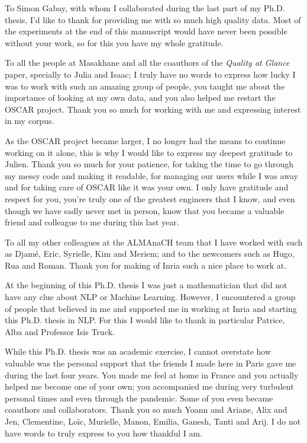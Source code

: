 To Simon Gabay, with whom I collaborated during the last part of my Ph.D. thesis, I'd like to thank for providing me with so much high quality data. Most of the experiments at the end of this manuscript would have never been possible without your work, so for this you have my whole gratitude.

To all the people at Masakhane and all the coauthors of the \emph{Quality at Glance} paper, specially to Julia and Isaac; I truly have no words to express how lucky I was to work with such an amazing group of people, you taught me about the importance of looking at my own data, and you also helped me restart the OSCAR project. Thank you so much for working with me and expressing interest in my corpus.

As the OSCAR project became larger, I no longer had the means to continue working on it alone, this is why I would like to express my deepest gratitude to Julien. Thank you so much for your patience, for taking the time to go through my messy code and making it readable, for managing our users while I was away and for taking care of OSCAR like it was your own. I only have gratitude and respect for you, you're truly one of the greatest engineers that I know, and even though we have sadly never met in person, know that you became a valuable friend and colleague to me during this last year.

To all my other colleagues at the ALMAnaCH team that I have worked with such as Djamé, Eric, Syrielle, Kim and Meriem; and to the newcomers such as Hugo, Rua and Roman. Thank you for making of Inria such a nice place to work at.

At the beginning of this Ph.D. thesis I was just a mathematician that did not have any clue about NLP or Machine Learning. However, I encountered a group of people that believed in me and supported me in working at Inria and starting this Ph.D. thesis in NLP. For this I would like to thank in particular Patrice, Alba and Professor Isis Truck.

While this Ph.D. thesis was an academic exercise, I cannot overstate how valuable was the personal support that the friends I made here in Paris gave me during the last four years. You made me feel at home in France and you actually helped me become one of your own; you accompanied me during very turbulent personal times and even through the pandemic. Some of you even became coauthors and collaborators. Thank you so much Yoann and Ariane, Alix and Jen, Clementine, Loïc, Murielle, Manon, Emilia, Ganesh, Tanti and Arij. I do not have words to truly express to you how thankful I am.

